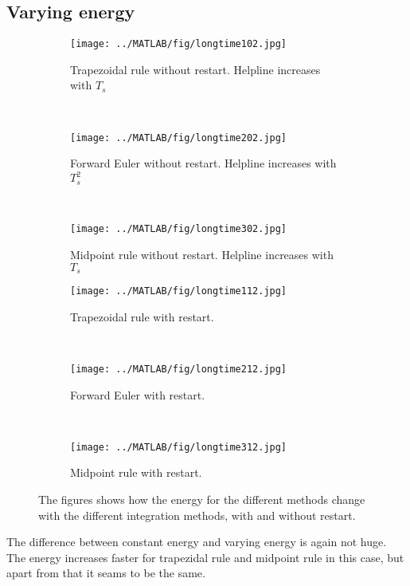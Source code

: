 \subsection{Varying energy}%
\begin{figure}[H]
        \centering
        \begin{subfigure}[b]{0.3\textwidth}
                \texttt{[image: ../MATLAB/fig/longtime102.jpg]}
                \caption{ Trapezoidal rule without restart. Helpline increases with $T_s$ }
                \label{fig:longtime102}
        \end{subfigure}
        ~
        \begin{subfigure}[b]{0.3\textwidth}
                \texttt{[image: ../MATLAB/fig/longtime202.jpg]}
                \caption{ Forward Euler without restart. Helpline increases with $T_s^2$ }
                \label{fig:longtime202}
        \end{subfigure}
        ~
        \begin{subfigure}[b]{0.3\textwidth}
                \texttt{[image: ../MATLAB/fig/longtime302.jpg]}
                \caption{ Midpoint rule without restart. Helpline increases with $T_s$ }
                \label{fig:longtime302}
        \end{subfigure}
        
        \begin{subfigure}[b]{0.3\textwidth}
                \texttt{[image: ../MATLAB/fig/longtime112.jpg]}
                \caption{ Trapezoidal rule with restart. }
                \label{fig:longtime112}
        \end{subfigure}
        ~
        \begin{subfigure}[b]{0.3\textwidth}
                \texttt{[image: ../MATLAB/fig/longtime212.jpg]}
                \caption{ Forward Euler with restart. }
                \label{fig:longtime212}
        \end{subfigure}
        ~
        \begin{subfigure}[b]{0.3\textwidth}
                \texttt{[image: ../MATLAB/fig/longtime312.jpg]}
                \caption{ Midpoint rule with restart. }
                \label{fig:longtime312}
        \end{subfigure}
        \caption{ The figures shows how the energy for the different methods change with the different integration methods, with and without restart.  }
        \label{fig:longtime2}
\end{figure}

The difference between constant energy and varying energy is again not huge. The energy increases faster for trapezidal rule and midpoint rule in this case, but apart from that it seams to be the same.